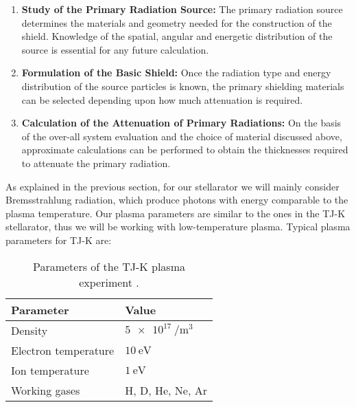 \begin{enumerate}
      \item \textbf{Study of the Primary Radiation Source:}
            The primary radiation source determines the materials and geometry needed for the construction of the shield.
            Knowledge of the spatial, angular and energetic distribution of the source is essential for any future calculation.


      \item \textbf{Formulation of the Basic Shield:}
            Once the radiation type and energy distribution of the source particles is known, the primary shielding materials can be selected depending upon how much attenuation is required.

      \item \textbf{Calculation of the Attenuation of Primary Radiations:}
            On the basis of the over-all system evaluation and the choice of material discussed above, approximate calculations can be performed to obtain the thicknesses required to attenuate the primary radiation.

\end{enumerate}

As explained in the previous section, for our stellarator we will mainly consider Bremsstrahlung radiation, which produce photons with energy comparable to the plasma temperature.
Our plasma parameters are similar to the ones in the TJ-K stellarator, thus we will be working with low-temperature plasma.
Typical plasma parameters for TJ-K are:


\begin{table}[H]
      \centering
      \caption{Parameters of the TJ-K plasma experiment  \cite{TJK}.}
      \begin{tabular}{>{\raggedright\arraybackslash}p{4cm} >{\raggedright\arraybackslash}p{4cm}}
            \toprule
            \textbf{Parameter}   & \textbf{Value}                \\
            \midrule
            Density              & $\SI{5e17}{\per\cubic\meter}$ \\
            Electron temperature & $\SI{10}{\electronvolt}$      \\
            Ion temperature      & $\SI{1}{\electronvolt}$       \\
            Working gases        & H, D, He, Ne, Ar              \\
            \bottomrule
      \end{tabular}
      \label{table:TJ-K_parameters}
\end{table}



